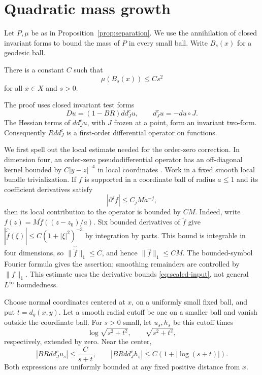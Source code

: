 \section{Quadratic mass growth}\label{sec:mass}

Let \(P,\mu\) be as in Proposition~\ref{prop:separation}.
We use the annihilation of closed invariant forms to bound the
mass of \(P\) in every small ball.
Write \(B_s(x)\) for a geodesic ball.
\begin{proposition}\label{prop:growth}
There is a constant \(C\) such that
\begin{equation}\label{eq:growth}
\mu(B_s(x))\le Cs^2
\end{equation}
for all \(x\in X\) and \(s>0\).
\end{proposition}

The proof uses closed invariant test forms
\[
Du=(1-BR)dd_J^cu,\qquad d_J^cu=-du\circ J.
\]
The Hessian terms of \(dd_J^cu\), with \(J\) frozen at a point,
form an invariant two-form. Consequently \(Rdd_J^c\) is a
first-order differential operator on functions.

We first spell out the local estimate needed for the
order-zero correction. In dimension four, an order-zero
pseudodifferential operator has an off-diagonal kernel bounded
by \(C|y-z|^{-4}\) in local coordinates
\cite[Section~0.2, Proposition~0.2.B]{Taylor1991}.
Work in a fixed smooth local bundle trivialization.
If \(f\) is supported in a coordinate ball of radius \(a\le1\)
and its coefficient derivatives satisfy
\begin{equation}\label{eq:scaled-input}
|\partial^jf|\le C_jMa^{-j},
\end{equation}
then its local contribution to the operator is bounded by
\(CM\). Indeed, write \(f(z)=M\widetilde f((z-z_0)/a)\).
Six bounded derivatives of \(\widetilde f\) give
\(|\widehat{\widetilde f}(\xi)|\le C(1+|\xi|^2)^{-3}\)
by integration by parts. This bound is integrable in four
dimensions, so \(\|\widehat{\widetilde f}\|_1\le C\), and hence
\(\|\widehat f\|_1\le CM\). The bounded-symbol Fourier formula
gives the assertion; smoothing remainders are controlled by
\(\|f\|_1\). This estimate uses the derivative bounds
\eqref{eq:scaled-input}, not general \(L^\infty\) boundedness.

\begin{lemma}\label{lem:radial-correction}
Choose normal coordinates centered at \(x\), on a uniformly
small fixed ball, and put \(t=d_g(x,y)\). Let a smooth radial
cutoff be one on a smaller ball and vanish outside the
coordinate ball. For \(s>0\) small, let \(u_s,h_s\) be this
cutoff times
\[
\log\sqrt{s^2+t^2},\qquad \sqrt{s^2+t^2},
\]
respectively, extended by zero. Near the center,
\begin{equation}\label{eq:correction-bounds}
|BRdd_J^cu_s|\le \frac{C}{s+t},
\qquad
|BRdd_J^ch_s|\le C(1+|\log(s+t)|).
\end{equation}
Both expressions are uniformly bounded at any fixed positive
distance from \(x\).
\end{lemma}

